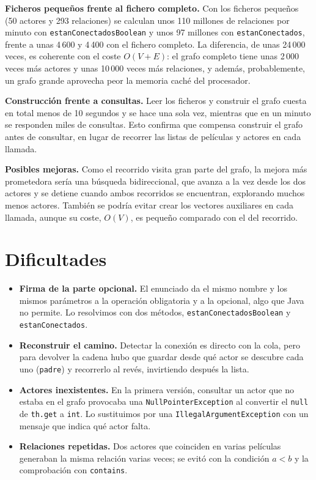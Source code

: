 \documentclass[a4paper,11pt]{report}
\begin{document}
\textbf{Ficheros pequeños frente al fichero completo.} Con los ficheros pequeños (50 actores y 293 relaciones) se calculan unos 110 millones de relaciones por minuto con \texttt{estanConectadosBoolean} y unos 97 millones con \texttt{estanConectados}, frente a unas 4\,600 y 4\,400 con el fichero completo. La diferencia, de unas 24\,000 veces, es coherente con el coste $O(V+E)$: el grafo completo tiene unas 2\,000 veces más actores y unas 10\,000 veces más relaciones, y además, probablemente, un grafo grande aprovecha peor la memoria caché del procesador.

\textbf{Construcción frente a consultas.} Leer los ficheros y construir el grafo cuesta en total menos de 10 segundos y se hace una sola vez, mientras que en un minuto se responden miles de consultas. Esto confirma que compensa construir el grafo antes de consultar, en lugar de recorrer las listas de películas y actores en cada llamada.

\textbf{Posibles mejoras.} Como el recorrido visita gran parte del grafo, la mejora más prometedora sería una búsqueda bidireccional, que avanza a la vez desde los dos actores y se detiene cuando ambos recorridos se encuentran, explorando muchos menos actores. También se podría evitar crear los vectores auxiliares en cada llamada, aunque su coste, $O(V)$, es pequeño comparado con el del recorrido.

\section{\label{dificultades}Dificultades}

\begin{itemize}
    \item \textbf{Firma de la parte opcional.} El enunciado da el mismo nombre y los mismos parámetros a la operación obligatoria y a la opcional, algo que Java no permite. Lo resolvimos con dos métodos, \texttt{estanConectadosBoolean} y \texttt{estanConectados}.
    \item \textbf{Reconstruir el camino.} Detectar la conexión es directo con la cola, pero para devolver la cadena hubo que guardar desde qué actor se descubre cada uno (\texttt{padre}) y recorrerlo al revés, invirtiendo después la lista.
    \item \textbf{Actores inexistentes.} En la primera versión, consultar un actor que no estaba en el grafo provocaba una \texttt{NullPointerException} al convertir el \texttt{null} de \texttt{th.get} a \texttt{int}. Lo sustituimos por una \texttt{IllegalArgumentException} con un mensaje que indica qué actor falta.
    \item \textbf{Relaciones repetidas.} Dos actores que coinciden en varias películas generaban la misma relación varias veces; se evitó con la condición $a < b$ y la comprobación con \texttt{contains}.
\end{itemize}
\end{document}
